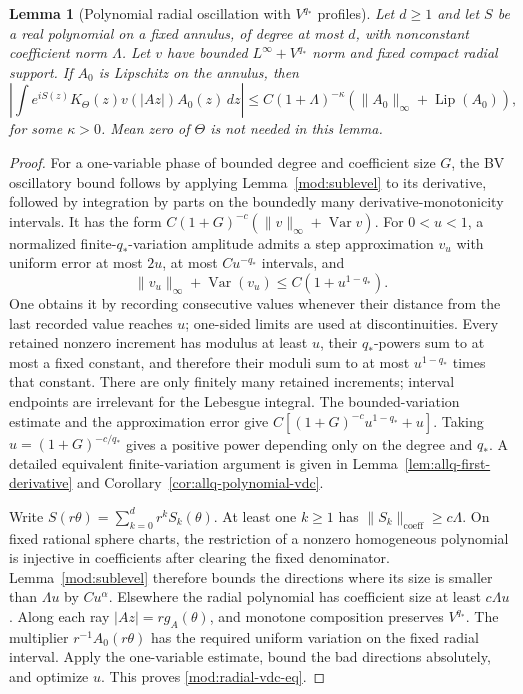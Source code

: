 \documentclass[11pt]{article}
\numberwithin{equation}{section}
\newtheorem{lemma}[theorem]{Lemma}
\theoremstyle{remark}
\theoremstyle{definition}
\begin{document}
\begin{lemma}[Polynomial radial oscillation with $V^{q_*}$ profiles]
\label{mod:radial-vdc}
Let $d\ge1$ and let $S$ be a real polynomial on a fixed annulus, of degree at most $d$,
with nonconstant coefficient norm $\Lambda$. Let $v$ have bounded
$L^\infty+V^{q_*}$ norm and fixed compact radial support. If $A_0$ is Lipschitz
on the annulus, then
\begin{equation}\label{mod:radial-vdc-eq}
 \left|\int e^{iS(z)}K_\Theta(z)v(|Az|)A_0(z)\,dz\right|
 \le C(1+\Lambda)^{-\kappa}
 (\|A_0\|_\infty+\operatorname{Lip}(A_0)),
\end{equation}
for some $\kappa>0$. Mean zero of $\Theta$ is not needed in this lemma.
\end{lemma}
\begin{proof}
For a one-variable phase of bounded degree and coefficient size $G$,
the BV oscillatory bound follows by applying Lemma~\ref{mod:sublevel}
to its derivative, followed by integration by parts on the boundedly
many derivative-monotonicity intervals. It has the form
$C(1+G)^{-c}(\|v\|_\infty+\operatorname{Var}v)$.
For $0<u<1$, a normalized finite-$q_*$-variation amplitude admits
a step approximation $v_u$ with uniform error at most $2u$, at most
$C u^{-q_*}$ intervals, and
\[
 \|v_u\|_\infty+\operatorname{Var}(v_u)
 \le C(1+u^{1-q_*}).
\]
One obtains it by recording consecutive values whenever their distance
from the last recorded value reaches $u$; one-sided limits are used at
discontinuities. Every retained nonzero increment has modulus at least
$u$, their $q_*$-powers sum to at most a fixed constant, and therefore
their moduli sum to at most $u^{1-q_*}$ times that constant. There are
only finitely many retained increments; interval endpoints are
irrelevant for the Lebesgue integral. The bounded-variation estimate
and the approximation error give
$C[(1+G)^{-c}u^{1-q_*}+u]$. Taking
$u=(1+G)^{-c/q_*}$ gives a positive power depending only on the degree
and $q_*$. A detailed equivalent finite-variation argument is given in
Lemma~\ref{lem:allq-first-derivative} and
Corollary~\ref{cor:allq-polynomial-vdc}.

Write $S(r\theta)=\sum_{k=0}^d r^kS_k(\theta)$. At least one $k\ge1$
has $\|S_k\|_{\mathrm{coeff}}\ge c\Lambda$. On fixed rational sphere
charts, the restriction of a nonzero homogeneous polynomial is injective
in coefficients after clearing the fixed denominator. Lemma~\ref{mod:sublevel}
therefore bounds the directions where its size is smaller than
$\Lambda u$ by $Cu^\alpha$. Elsewhere the radial polynomial has coefficient
size at least $c\Lambda u$. Along each ray $|Az|=rg_A(\theta)$, and
monotone composition preserves $V^{q_*}$. The multiplier $r^{-1}A_0(r\theta)$
has the required uniform variation on the fixed radial interval. Apply
the one-variable estimate, bound the bad directions absolutely, and
optimize $u$. This proves \eqref{mod:radial-vdc-eq}.
\end{proof}
\end{document}
